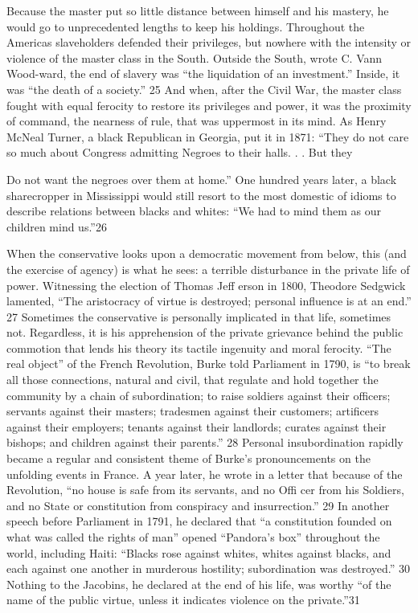  \par 
Because the master put so little distance between himself and his mastery, he would go to unprecedented lengths to keep his holdings. Throughout the Americas slaveholders defended their privileges, but nowhere with the intensity or violence of the master class in the South. Outside the South, wrote C. Vann Wood-ward, the end of slavery was “the liquidation of an investment.” Inside, it was “the death of a society.” {\color{blue}25} And when, after the Civil War, the master class fought with equal ferocity to restore its privileges and power, it was the proximity of command, the nearness of rule, that was uppermost in its mind. As Henry McNeal Turner, a black Republican in Georgia, put it in 1871: “They do not care so much about Congress admitting Negroes to their halls. . . But they
 \par 
Do not want the negroes over them at home.” One hundred years later, a black sharecropper in Mississippi would still resort to the most domestic of idioms to describe relations between blacks and whites: “We had to mind them as our children mind us.”{\color{blue}26}
 \par 
When the conservative looks upon a democratic movement from below, this (and the exercise of agency) is what he sees: a terrible disturbance in the private life of power. Witnessing the election of Thomas Jeff erson in 1800, Theodore Sedgwick lamented, “The aristocracy of virtue is destroyed; personal influence is at an end.” {\color{blue}27} Sometimes the conservative is personally implicated in that life, sometimes not. Regardless, it is his apprehension of the private grievance behind the public commotion that lends his theory its tactile ingenuity and moral ferocity. “The real object” of the French Revolution, Burke told Parliament in 1790, is “to break all those connections, natural and civil, that regulate and hold together the community by a chain of subordination; to raise soldiers against their officers; servants against their masters; tradesmen against their customers; artificers against their employers; tenants against their landlords; curates against their bishops; and children against their parents.” {\color{blue}28} Personal insubordination rapidly became a regular and consistent theme of Burke’s pronouncements on the unfolding events in France. A year later, he wrote in a letter that because of the Revolution, “no house is safe from its servants, and no Offi cer from his Soldiers, and no State or constitution from conspiracy and insurrection.” {\color{blue}29} In another speech before Parliament in 1791, he declared that “a constitution founded on what was called the rights of man” opened “Pandora’s box” throughout the world, including Haiti: “Blacks rose against whites, whites against blacks, and each against one another in murderous hostility; subordination was destroyed.” {\color{blue}30} Nothing to the Jacobins, he declared at the end of his life, was worthy “of the name of the public virtue, unless it indicates violence on the private.”{\color{blue}31}
